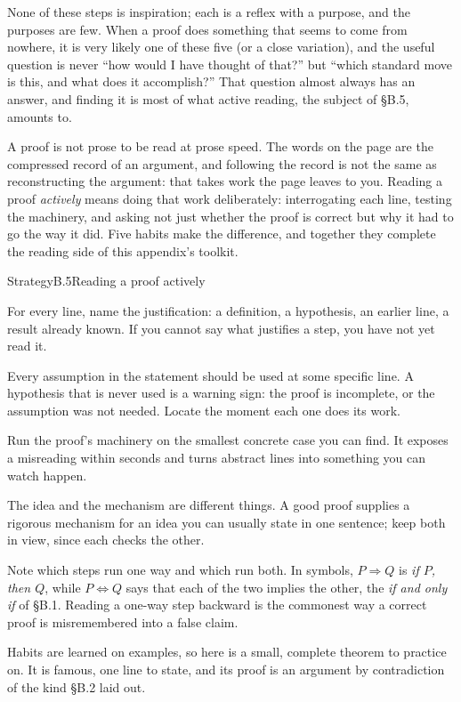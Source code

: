 \documentclass[a4paper,12pt,oneside]{memoir}
\begin{document}
None of these steps is inspiration; each is a reflex with a purpose, and the purposes are few. When a proof does something that seems to come from nowhere, it is very likely one of these five (or a close variation), and the useful question is never “how would I have thought of that?” but “which standard move is this, and what does it accomplish?” That question almost always has an answer, and finding it is most of what active reading, the subject of §B.5, amounts to.


A proof is not prose to be read at prose speed. The words on the page are the compressed record of an argument, and following the record is not the same as reconstructing the argument: that takes work the page leaves to you. Reading a proof \emph{actively} means doing that work deliberately: interrogating each line, testing the machinery, and asking not just whether the proof is correct but why it had to go the way it did. Five habits make the difference, and together they complete the reading side of this appendix’s toolkit.

\begin{envstrategy}{Strategy}{B.5}{Reading a proof actively}
\begin{steps}
  \item {} For every line, name the justification: a definition, a hypothesis, an earlier line, a result already known. If you cannot say what justifies a step, you have not yet read it.
  \item {} Every assumption in the statement should be used at some specific line. A hypothesis that is never used is a warning sign: the proof is incomplete, or the assumption was not needed. Locate the moment each one does its work.
  \item {} Run the proof’s machinery on the smallest concrete case you can find. It exposes a misreading within seconds and turns abstract lines into something you can watch happen.
  \item {} The idea and the mechanism are different things. A good proof supplies a rigorous mechanism for an idea you can usually state in one sentence; keep both in view, since each checks the other.
  \item {} Note which steps run one way and which run both. In symbols, \(P \Rightarrow Q\) is \emph{if \(P\), then \(Q\)}, while \(P \Leftrightarrow Q\) says that each of the two implies the other, the \emph{if and only if} of §B.1. Reading a one-way step backward is the commonest way a correct proof is misremembered into a false claim.
\end{steps}
\end{envstrategy}
Habits are learned on examples, so here is a small, complete theorem to practice on. It is famous, one line to state, and its proof is an argument by contradiction of the kind §B.2 laid out.
\end{document}
